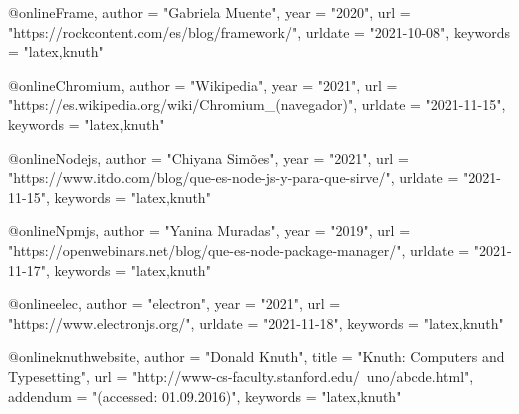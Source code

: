 
@online{Frame,
author = "Gabriela Muente",
year = "2020",
url = "https://rockcontent.com/es/blog/framework/",
urldate = "2021-10-08",
keywords  = "latex,knuth"}

@online{Chromium,
author = "Wikipedia",
year = "2021",
url = "https://es.wikipedia.org/wiki/Chromium_(navegador)",
urldate = "2021-11-15",
keywords  = "latex,knuth"}

@online{Nodejs,
author = "Chiyana Simões",
year = "2021",
url = "https://www.itdo.com/blog/que-es-node-js-y-para-que-sirve/",
urldate = "2021-11-15",
keywords  = "latex,knuth"}

@online{Npmjs,
author = "Yanina Muradas",
year = "2019",
url = "https://openwebinars.net/blog/que-es-node-package-manager/",
urldate = "2021-11-17",
keywords  = "latex,knuth"}

@online{elec,
author = "electron",
year = "2021",
url = "https://www.electronjs.org/",
urldate = "2021-11-18",
keywords  = "latex,knuth"}

@online{knuthwebsite,
    author    = "Donald Knuth",
    title     = "Knuth: Computers and Typesetting",
    url       = "http://www-cs-faculty.stanford.edu/~uno/abcde.html",
    addendum = "(accessed: 01.09.2016)",
    keywords  = "latex,knuth"
}

